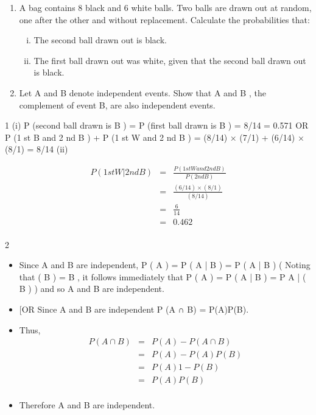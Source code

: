 \documentclass[a4paper,12pt]{article}
\begin{document}
\begin{enumerate}
\item A bag contains 8 black and 6 white balls. Two balls are drawn out at random, one
after the other and without replacement.
Calculate the probabilities that:

\begin{enumerate}[(i)]
\item The second ball drawn out is black.
\item The first ball drawn out was white, given that the second ball drawn out is
black.
\end{enumerate}

\item
Let A and B denote independent events.
Show that A and B , the complement of event B, are also independent events.


\end{enumerate}
\newpage

1
(i)
P (second ball drawn is B ) = P (first ball drawn is B ) = 8/14 = 0.571
OR P (1 st B and 2 nd B ) + P (1 st W and 2 nd B )
= (8/14) × (7/1) + (6/14) × (8/1) = 8/14
(ii)

\begin{eqnarray*}
P (1 st W | 2 nd B ) &=& \frac{P (1 st W and 2 nd B )}{ P (2 nd B )} \\  
&=& \frac{ (6/14) × (8/1) }{ (8/14) } \\
&=& \frac{6}{14} \\  &=& 0.462\\
\end{eqnarray*}

2
\begin{itemize}
\item Since A and B are independent, P ( A ) = P ( A | B ) = P ( A | B )
(
Noting that ( B ) = B , it follows immediately that P ( A ) = P ( A | B ) = P A | ( B )
)
and so A and B are independent.
\item [OR
Since A and B are independent P (A ∩ B) = P(A)P(B).
\item Thus,
\begin{eqnarray*}
P(A \cap B ) &=& P(A) − P(A \cap B) \\ 
&=& P(A) − P(A)P(B) \\ &=& P(A){1 − P(B)} \\ &=& P(A)P( B )
\\
\end{eqnarray*}

\item Therefore A and B are independent.
\end{itemize}
\end{document}
